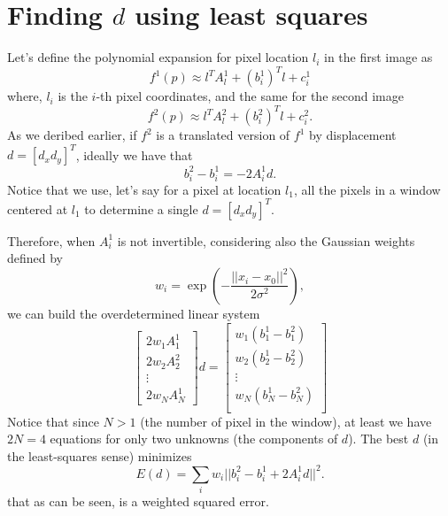 \section*{Finding $d$ using least squares}
Let's define the polynomial expansion for pixel location $l_i$ in the first image as
\begin{equation}
  f^1(p) \approx l^TA_l^1 + {(b_i^1)}^Tl + c_i^1
\end{equation}
where, $l_i$ is the $i$-th pixel coordinates, and the same for the second image
\begin{equation}
  f^2(p) \approx l^TA_l^2 + {(b_i^2)}^Tl + c_i^2.
\end{equation}  
As we deribed earlier, if $f^2$ is a translated version of $f^1$ by displacement $d=[d_x d_y]^T$, ideally we have that
\begin{equation}
  b^2_i-b^1_i = -2A^1_id.
\end{equation}
Notice that we use, let's say for a pixel at location $l_1$, all the pixels in a window centered at $l_1$ to determine a single $d=[d_x d_y]^T$.

Therefore, when $A^1_i$ is not invertible, considering also the Gaussian weights defined by
\begin{equation}
  w_i = \exp\left( -\frac{||x_i-x_0||^2}{2\sigma^2} \right),
\end{equation}
we can build the overdetermined linear system
\begin{equation}
  \begin{bmatrix}
2w_1A^1_1 \\
2w_2A^2_2 \\
\vdots \\
2w_NA^1_N
\end{bmatrix}
d =
\begin{bmatrix}
w_1(b^1_1-b^2_1) \\
w_2(b^1_2-b^2_2) \\
\vdots \\
w_N(b^1_N-b^2_N) \\
\end{bmatrix}
\end{equation}
Notice that since $N>1$ (the number of pixel in the window), at least we have $2N=4$ equations for only two unknowns (the components of $d$). The best $d$ (in the least-squares sense) minimizes
\begin{equation}
  E(d) = \sum_i w_i ||b^2_i - b^1_i + 2A^1_id||^2.
\end{equation}
that as can be seen, is a weighted squared error.

